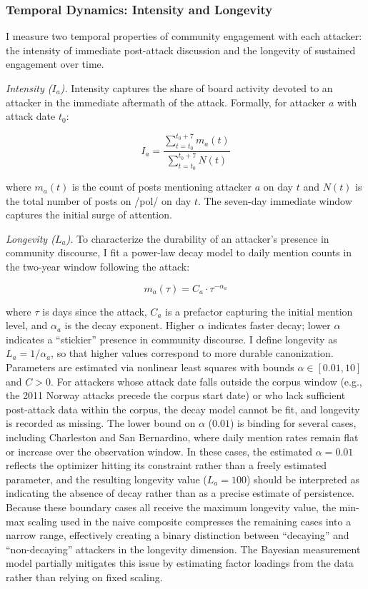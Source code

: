 \documentclass[12pt]{article}
\begin{document}
\subsubsection{Temporal Dynamics: Intensity and Longevity}

I measure two temporal properties of community engagement with each attacker: the intensity of immediate post-attack discussion and the longevity of sustained engagement over time.

\textit{Intensity ($I_a$).} Intensity captures the share of board activity devoted to an attacker in the immediate aftermath of the attack. Formally, for attacker $a$ with attack date $t_0$:

\begin{equation}
I_a = \frac{\sum_{t=t_0}^{t_0 + 7} m_a(t)}{\sum_{t=t_0}^{t_0 + 7} N(t)}
\end{equation}

\noindent where $m_a(t)$ is the count of posts mentioning attacker $a$ on day $t$ and $N(t)$ is the total number of posts on /pol/ on day $t$. The seven-day immediate window captures the initial surge of attention.

\textit{Longevity ($L_a$).} To characterize the durability of an attacker's presence in community discourse, I fit a power-law decay model to daily mention counts in the two-year window following the attack:

\begin{equation}
m_a(\tau) = C_a \cdot \tau^{-\alpha_a}
\end{equation}

\noindent where $\tau$ is days since the attack, $C_a$ is a prefactor capturing the initial mention level, and $\alpha_a$ is the decay exponent. Higher $\alpha$ indicates faster decay; lower $\alpha$ indicates a ``stickier'' presence in community discourse. I define longevity as $L_a = 1 / \alpha_a$, so that higher values correspond to more durable canonization. Parameters are estimated via nonlinear least squares with bounds $\alpha \in [0.01, 10]$ and $C > 0$. For attackers whose attack date falls outside the corpus window (e.g., the 2011 Norway attacks precede the corpus start date) or who lack sufficient post-attack data within the corpus, the decay model cannot be fit, and longevity is recorded as missing. The lower bound on $\alpha$ ($0.01$) is binding for several cases, including Charleston and San Bernardino, where daily mention rates remain flat or increase over the observation window. In these cases, the estimated $\alpha = 0.01$ reflects the optimizer hitting its constraint rather than a freely estimated parameter, and the resulting longevity value ($L_a = 100$) should be interpreted as indicating the absence of decay rather than as a precise estimate of persistence. Because these boundary cases all receive the maximum longevity value, the min-max scaling used in the naive composite compresses the remaining cases into a narrow range, effectively creating a binary distinction between ``decaying'' and ``non-decaying'' attackers in the longevity dimension. The Bayesian measurement model partially mitigates this issue by estimating factor loadings from the data rather than relying on fixed scaling.
\end{document}

